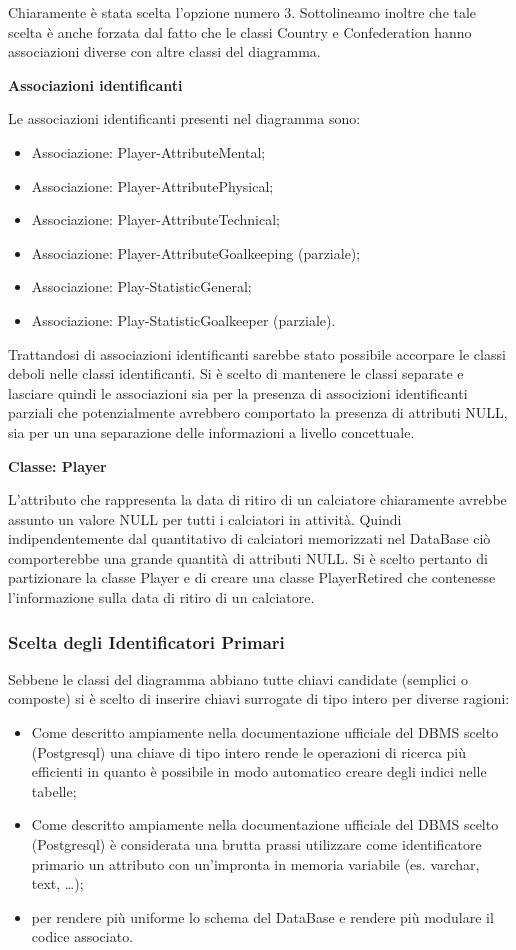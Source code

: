 Chiaramente è stata scelta l'opzione numero 3.
Sottolineamo inoltre che tale scelta è anche forzata dal fatto che le classi Country e Confederation
hanno associazioni diverse con altre classi del diagramma.

\textbf{Associazioni identificanti}

Le associazioni identificanti presenti nel diagramma sono:
\begin{itemize}
	\item Associazione: Player-AttributeMental;
	\item Associazione: Player-AttributePhysical;
	\item Associazione: Player-AttributeTechnical;
	\item Associazione: Player-AttributeGoalkeeping (parziale);
	\item Associazione: Play-StatisticGeneral;
	\item Associazione: Play-StatisticGoalkeeper (parziale).
\end{itemize}

Trattandosi di associazioni identificanti sarebbe stato possibile accorpare le classi deboli
nelle classi identificanti. Si è scelto di mantenere le classi separate e lasciare quindi le
associazioni sia per la presenza di associzioni identificanti parziali che potenzialmente
avrebbero comportato la presenza di attributi NULL, sia per un una separazione delle informazioni
a livello concettuale.

\textbf{Classe: Player}

L'attributo che rappresenta la data di ritiro di un calciatore chiaramente avrebbe assunto un
valore NULL per tutti i calciatori in attività. Quindi indipendentemente dal quantitativo di
calciatori memorizzati nel DataBase ciò comporterebbe una grande quantità di attributi NULL.
Si è scelto pertanto di partizionare la classe Player e di creare una classe PlayerRetired
che contenesse l'informazione sulla data di ritiro di un calciatore.


\newpage
\bigskip
\subsubsection{Scelta degli Identificatori Primari}
\bigskip

Sebbene le classi del diagramma abbiano tutte chiavi candidate (semplici o composte) si è scelto di
inserire chiavi surrogate di tipo intero per diverse ragioni:
\begin{itemize}
	\item Come descritto ampiamente nella documentazione ufficiale del DBMS scelto (Postgresql)
		una chiave di tipo intero rende le operazioni di ricerca più efficienti in quanto è possibile
		in modo automatico creare degli indici nelle tabelle;
	\item Come descritto ampiamente nella documentazione ufficiale del DBMS scelto (Postgresql)
		è considerata una brutta prassi utilizzare come identificatore primario un attributo con
		un'impronta in memoria variabile (es. varchar, text, \dots);
	\item per rendere più uniforme lo schema del DataBase e rendere più modulare il codice associato.
\end{itemize}

